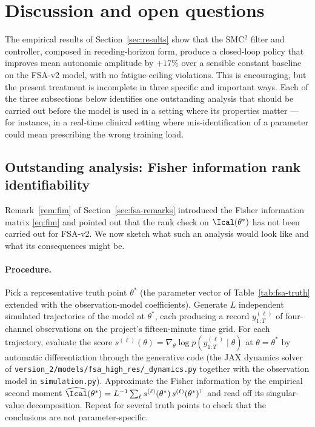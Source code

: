 \section{Discussion and open questions}\label{sec:discussion}

The empirical results of Section~\ref{sec:results} show that the
SMC${}^2$ filter and controller, composed in receding-horizon form,
produce a closed-loop policy that improves mean autonomic amplitude by
$+17\%$ over a sensible constant baseline on the FSA-v2 model, with no
fatigue-ceiling violations. This is encouraging, but the present
treatment is incomplete in three specific and important ways. Each of
the three subsections below identifies one outstanding analysis that
should be carried out before the model is used in a setting where its
properties matter --- for instance, in a real-time clinical setting
where mis-identification of a parameter could mean prescribing the wrong
training load.

\subsection{Outstanding analysis: Fisher information rank
identifiability}\label{sec:discussion-fim}

Remark~\ref{rem:fim} of Section~\ref{sec:fsa-remarks} introduced the
Fisher information matrix \eqref{eq:fim} and pointed out that the rank
check on $\Ical(\theta^*)$ has not been carried out for FSA-v2. We now
sketch what such an analysis would look like and what its consequences
might be.

\paragraph{Procedure.} Pick a representative truth point $\theta^*$ (the
parameter vector of Table~\ref{tab:fsa-truth} extended with the
observation-model coefficients). Generate $L$ independent simulated
trajectories of the model at $\theta^*$, each producing a record
$y^{(\ell)}_{1:T}$ of four-channel observations on the project's
fifteen-minute time grid. For each trajectory, evaluate the score
$s^{(\ell)}(\theta) = \nabla_\theta \log p(y^{(\ell)}_{1:T} \mid \theta)$
at $\theta = \theta^*$ by automatic differentiation through the
generative code (the JAX dynamics solver of
\texttt{version\_2/models/fsa\_high\_res/\_dynamics.py} together with the
observation model in \texttt{simulation.py}). Approximate the Fisher
information by the empirical second moment
\(
  \widehat\Ical(\theta^*) = L^{-1} \sum_\ell s^{(\ell)}(\theta^*)\,s^{(\ell)}(\theta^*)^{\!\top}
\)
and read off its singular-value decomposition. Repeat for several truth
points to check that the conclusions are not parameter-specific.

